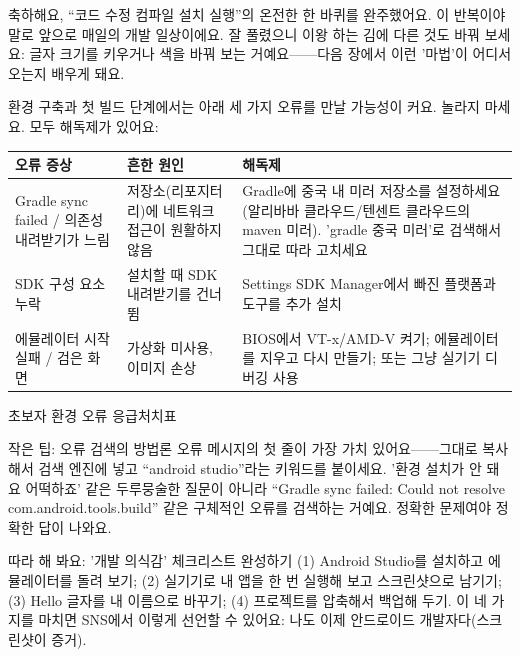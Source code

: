 축하해요, “코드 수정 컴파일 설치 실행”의 온전한 한 바퀴를 완주했어요. 이 반복이야말로 앞으로 매일의 개발 일상이에요. 잘 풀렸으니 이왕 하는 김에 다른 것도 바꿔 보세요: 글자 크기를 키우거나 색을 바꿔 보는 거예요——다음 장에서 이런 '마법'이 어디서 오는지 배우게 돼요.


환경 구축과 첫 빌드 단계에서는 아래 세 가지 오류를 만날 가능성이 커요. 놀라지 마세요. 모두 해독제가 있어요:

\begin{center}
\begin{tabularx}{\linewidth}{|X|X|X|}
\hline
\textbf{오류 증상} & \textbf{흔한 원인} & \textbf{해독제} \tabularnewline
\hline
Gradle sync failed / 의존성 내려받기가 느림 & 저장소(리포지터리)에 네트워크 접근이 원활하지 않음 & Gradle에 중국 내 미러 저장소를 설정하세요(알리바바 클라우드/텐센트 클라우드의 maven 미러). 'gradle 중국 미러'로 검색해서 그대로 따라 고치세요 \tabularnewline
SDK 구성 요소 누락 & 설치할 때 SDK 내려받기를 건너뜀 & Settings SDK Manager에서 빠진 플랫폼과 도구를 추가 설치 \tabularnewline
에뮬레이터 시작 실패 / 검은 화면 & 가상화 미사용, 이미지 손상 & BIOS에서 VT-x/AMD-V 켜기; 에뮬레이터를 지우고 다시 만들기; 또는 그냥 실기기 디버깅 사용 \tabularnewline
\hline
\end{tabularx}
\end{center}

\begin{center}\small\color{gray}초보자 환경 오류 응급처치표\end{center}

\begin{tcbinfo}{작은 팁: 오류 검색의 방법론}
오류 메시지의 첫 줄이 가장 가치 있어요——그대로 복사해서 검색 엔진에 넣고 “android studio”라는 키워드를 붙이세요. '환경 설치가 안 돼요 어떡하죠' 같은 두루뭉술한 질문이 아니라 “Gradle sync failed: Could not resolve com.android.tools.build” 같은 구체적인 오류를 검색하는 거예요. 정확한 문제여야 정확한 답이 나와요.

\end{tcbinfo}

\begin{tcbpractice}{따라 해 봐요: '개발 의식감' 체크리스트 완성하기}
(1) Android Studio를 설치하고 에뮬레이터를 돌려 보기; (2) 실기기로 내 앱을 한 번 실행해 보고 스크린샷으로 남기기; (3) Hello 글자를 내 이름으로 바꾸기; (4) 프로젝트를 압축해서 백업해 두기. 이 네 가지를 마치면 SNS에서 이렇게 선언할 수 있어요: 나도 이제 안드로이드 개발자다(스크린샷이 증거).

\end{tcbpractice}

